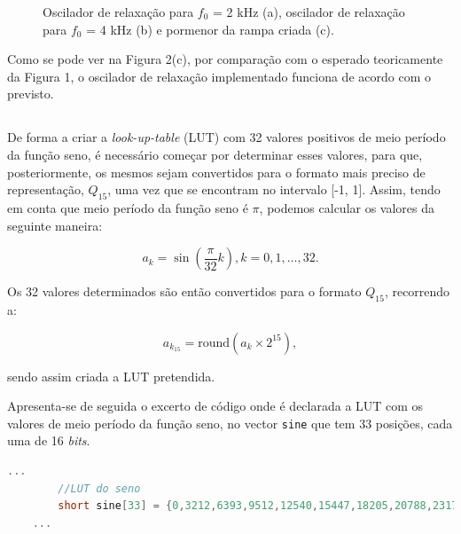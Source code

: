 \documentclass[11pt]{article}
\numberwithin{equation}{section}
\begin{document}
\begin{figure}[H]
	\vspace{-0.8em}
	\caption{Oscilador de relaxação para $f_{0}$ = 2 kHz (a), oscilador de relaxação para $f_{0}$ = 4 kHz (b) e pormenor da rampa criada (c).}
	\vspace{-0.8em}
\end{figure}

Como se pode ver na Figura 2(c), por comparação com o esperado teoricamente da Figura 1, o oscilador de relaxação implementado funciona de acordo com o previsto.

\subsection{} %

De forma a criar a \textit{look-up-table} (LUT) com 32 valores positivos de meio período da função seno, é necessário começar por determinar esses valores, para que, posteriormente, os mesmos sejam convertidos para o formato mais preciso de representação, $Q_{15}$, uma vez que se encontram no intervalo [-1, 1]. Assim, tendo em conta que meio período da função seno é $\pi$, podemos calcular os valores da seguinte maneira:

\vspace{-3mm}
\begin{equation}
a_{k} = \sin \left( \frac{\pi}{32}k \right), k = 0, 1, \ldots, 32.
\end{equation}

Os 32 valores determinados são então convertidos para o formato $Q_{15}$, recorrendo a:

\vspace{-3mm}
\begin{equation}
a_{k_{15}} = \text{round}\left(a_{k} \times 2^{15} \right),
\end{equation} 

sendo assim criada a LUT pretendida.

Apresenta-se de seguida o excerto de código onde é declarada a LUT com os valores de meio período da função seno, no vector \texttt{sine} que tem 33 posições, cada uma de 16 \textit{bits}. 

\begin{lstlisting}[language=C]
	...
		//LUT do seno
		short sine[33] = {0,3212,6393,9512,12540,15447,18205,20788,23170,25330,27246,28899,30274,31357,		32138,32610,32767,32610,32138,31357,30274,28899,27246,25330,23170,20788,18205,	15447,12540,9512,6393,3212,0}; 
	...
\end{lstlisting}
\end{document}
